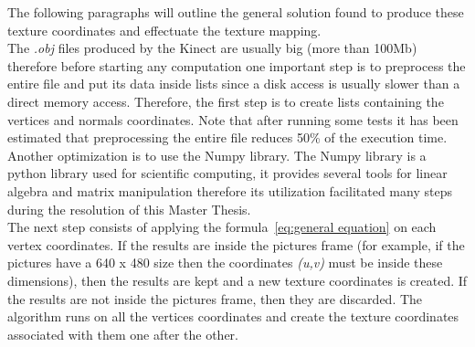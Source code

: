The following paragraphs will outline the general solution found to produce these texture coordinates and effectuate the texture mapping.\\

The \textit{.obj} files produced by the Kinect are usually big (more than 100Mb) therefore before starting any computation one important step is to preprocess the entire file and put its data inside lists since a disk access is usually slower than a direct memory access. Therefore, the first step is to create lists containing the vertices and normals coordinates. Note that after running some tests it has been estimated that preprocessing the entire file reduces 50\% of the execution time.\\ 

Another optimization is to use the Numpy library. The Numpy library is a python library used for scientific computing, it provides several tools for linear algebra and matrix manipulation therefore its utilization facilitated many steps  during the resolution of this Master Thesis.\\

The next step consists of applying the formula~\ref{eq:general equation} on each vertex coordinates. If the results are inside the pictures frame (for example, if the pictures have a 640 x 480 size then the coordinates \textit{(u,v)} must be inside these dimensions), then the results are kept and a new texture coordinates is created. If the results are not inside the pictures frame, then they are discarded. The algorithm runs on all the vertices coordinates and create the texture coordinates associated with them one after the other.



